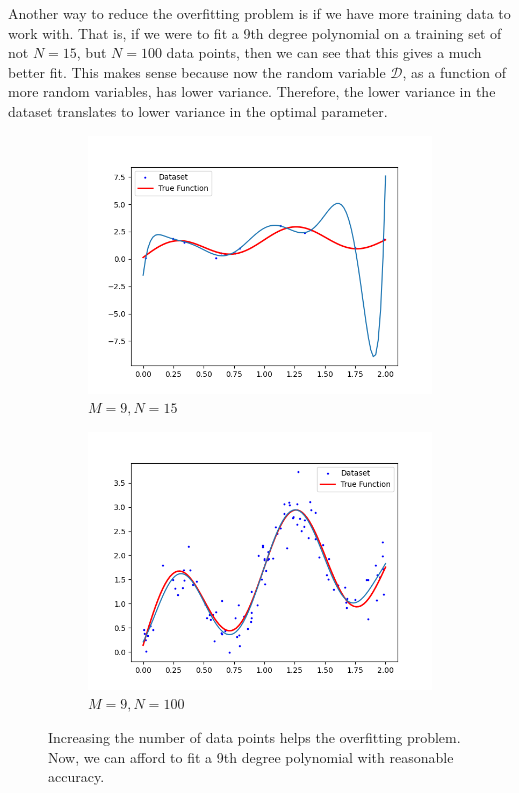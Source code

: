 \documentclass{article}
\theoremstyle{definition}
\theoremstyle{remark}
\theoremstyle{definition}
\begin{document}
Another way to reduce the overfitting problem is if we have more training data to work with. That is, if we were to fit a 9th degree polynomial on a training set of not $N = 15$, but $N = 100$ data points, then we can see that this gives a much better fit. This makes sense because now the random variable $\mathcal{D}$, as a function of more random variables, has lower variance. Therefore, the lower variance in the dataset translates to lower variance in the optimal parameter. 
\begin{figure}[hbt!]
    \centering
    \begin{subfigure}[b]{0.48\textwidth}
    \centering
        \includegraphics[width=\textwidth]{polynomial_first/poly_9_fit.png}
        \caption{$M = 9, N = 15$}
        \label{fig:d}
    \end{subfigure}
    \hfill 
    \begin{subfigure}[b]{0.48\textwidth}
    \centering
        \includegraphics[width=\textwidth]{polynomial_first/increased_data.png}
        \caption{$M = 9, N = 100$}
        \label{fig:d}
    \end{subfigure}
    \caption{Increasing the number of data points helps the overfitting problem. Now, we can afford to fit a 9th degree polynomial with reasonable accuracy.}
\end{figure}
\end{document}
